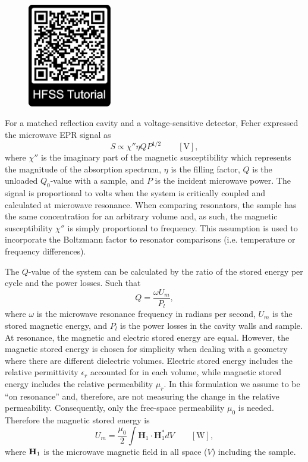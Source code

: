 \begin{figure}
\centering
\includegraphics[width=3.65cm]{Kapitel/Appendix/HFSSTutQR.eps}
\end{figure}

For a matched reflection cavity and a voltage-sensitive detector, Feher expressed the microwave EPR signal as
\begin{equation}
    S \propto \chi'' \eta Q P^{1/2} \qquad [\text{V}],\label{ch2-fehereq}
\end{equation}
where $\chi''$ is the imaginary part of the magnetic susceptibility which represents the magnitude of the absorption spectrum, $\eta$ is the filling factor, $Q$ is the unloaded $Q_0$-value with a sample, and $P$ is the incident microwave power.  \cite{FeherSignal} The signal is proportional to volts when the system is critically coupled and calculated at microwave resonance. When comparing resonators, the sample has the same concentration for an arbitrary volume and, as such, the magnetic susceptibility $\chi''$ is simply proportional to frequency. This assumption is used to incorporate the Boltzmann factor to resonator comparisons (i.e. temperature or frequency differences).

The $Q$-value of the system can be calculated by the ratio of the stored energy per cycle and the power losses. Such that
\begin{equation}
    Q = \frac{\omega U_m}{P_l},\label{ch2-Qval}
\end{equation}
where $\omega$ is the microwave resonance frequency in radians per second, $U_m$ is the stored magnetic energy, and $P_l$ is the power losses in the cavity walls and sample. At resonance, the magnetic and electric stored energy are equal. \cite{ramo1984fields} However, the magnetic stored energy is chosen for simplicity when dealing with a geometry where there are different dielectric volumes. Electric stored energy includes the relative permittivity $\epsilon_r$ accounted for in each volume, while magnetic stored energy includes the relative permeability $\mu_r$. In this formulation we assume to be ``on resonance'' and, therefore, are not measuring the change in the relative permeability. Consequently, only the free-space permeability $\mu_0$ is needed. Therefore the magnetic stored energy is
\begin{equation}
    U_m = \frac{\mu_0}{2} \int \mathbf{H}_1\cdot\mathbf{H}_1^* dV \qquad [\text{W}],
\end{equation}
where ${\textbf H}_1$ is the microwave magnetic field in all space ($V$) including the sample.

